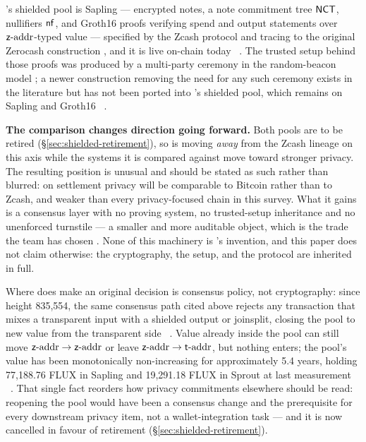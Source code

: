 \Flux's shielded pool is Sapling — encrypted notes, a note commitment tree $\mathsf{NCT}$, nullifiers $\mathsf{nf}$,
and Groth16 proofs \citep{groth2016size} verifying spend and output statements over $\mathsf{z}\text{-addr}$-typed
value — specified by the Zcash protocol \citep{zcashprotocol} and tracing to the original Zerocash
construction \citep{bensasson2014zerocash}, and it is live on-chain today \shipped\
. The trusted setup behind those proofs was produced by a
multi-party ceremony in the random-beacon model \citep{bowe2017mpc}; a newer construction removing the
need for any such ceremony exists in the literature \citep{bowe2019halo} but has not been ported into
\Flux's shielded pool, which remains on Sapling and Groth16 \shipped\ .

\textbf{The comparison changes direction going forward.} Both pools are to be retired
(\S\ref{sec:shielded-retirement}), so \Flux{} is moving \emph{away} from the Zcash lineage on this
axis while the systems it is compared against move toward stronger privacy. The resulting position is
unusual and should be stated as such rather than blurred: on settlement privacy \Flux{} will be
comparable to Bitcoin rather than to Zcash, and weaker than every privacy-focused chain in this
survey. What it gains is a consensus layer with no proving system, no trusted-setup inheritance and
no unenforced turnstile --- a smaller and more auditable object, which is the trade the team has
chosen \srcintent{design intake}.
None of this machinery is \Flux's invention, and this paper does not claim otherwise: the cryptography,
the setup, and the protocol are inherited in full.

Where \Flux does make an original decision is consensus policy, not cryptography: since height
835{,}554, the same consensus path cited above rejects any transaction that mixes a transparent input
with a shielded output or joinsplit, closing the pool to new value from the transparent side \shipped\
. Value already inside the pool can still move
$\mathsf{z}\text{-addr}\to\mathsf{z}\text{-addr}$ or leave $\mathsf{z}\text{-addr}\to\mathsf{t}\text{-addr}$, but nothing enters; the pool's value has been
monotonically non-increasing for approximately 5.4 years, holding 77{,}188.76 FLUX in Sapling and 19{,}291.18 FLUX in
Sprout at last measurement \shipped\ \srcmeasured{fluxd chain tip 2{,}917{,}115}{2026-09-03}. That
single fact reorders how privacy commitments elsewhere should be read: reopening the pool would have
been a consensus change and the prerequisite for every downstream privacy item, not a
wallet-integration task --- and it is now cancelled in favour of retirement (\S\ref{sec:shielded-retirement}).

